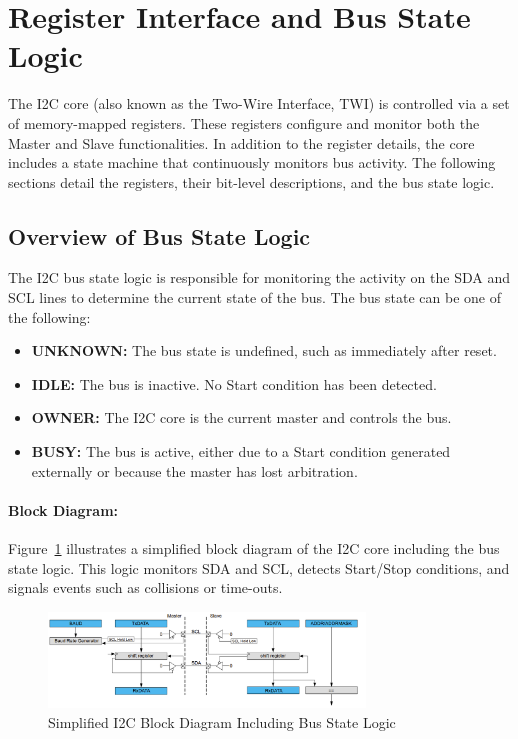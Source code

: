 \section{Register Interface and Bus State Logic}

The I2C core (also known as the Two-Wire Interface, TWI) is controlled via a set of memory-mapped registers. These
registers configure and monitor both the Master and Slave functionalities. In addition to the register details, the core
includes a state machine that continuously monitors bus activity. The following sections detail the registers, their bit-level
descriptions, and the bus state logic.

\subsection{Overview of Bus State Logic}

The I2C bus state logic is responsible for monitoring the activity on the SDA and SCL lines to determine the current state
of the bus. The bus state can be one of the following:

\begin{itemize}
  \item \textbf{UNKNOWN:} The bus state is undefined, such as immediately after reset.
  \item \textbf{IDLE:} The bus is inactive. No Start condition has been detected.
  \item \textbf{OWNER:} The I2C core is the current master and controls the bus.
  \item \textbf{BUSY:} The bus is active, either due to a Start condition generated externally or because the master has lost
      arbitration.
\end{itemize}

\paragraph{Block Diagram:}  
Figure~\ref{fig:i2c_block_diagram} illustrates a simplified block diagram of the I2C core including the bus state logic.
This logic monitors SDA and SCL, detects Start/Stop conditions, and signals events such as collisions or time-outs.

\begin{figure}[H]
    \centering
    \includegraphics[width=0.75\textwidth]{images/i2c_block_diagram.png}  %
    \caption{Simplified I2C Block Diagram Including Bus State Logic}
    \label{fig:i2c_block_diagram}
\end{figure}

